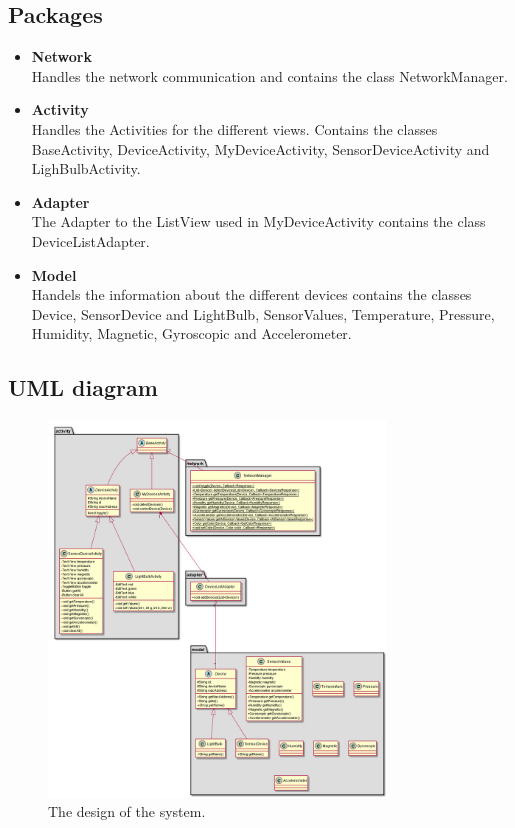 \documentclass[a4paper]{article}
\begin{document}
	\subsection{Packages}
	\begin{itemize}
		\item {\textbf{Network}} \\
        Handles the network communication and contains the class NetworkManager.
		\item {\textbf{Activity}}\\
        Handles the Activities for the different views. Contains the classes BaseActivity, DeviceActivity, MyDeviceActivity, SensorDeviceActivity and LighBulbActivity.
		\item {\textbf{Adapter}}\\
        The Adapter to the ListView used in MyDeviceActivity contains the class DeviceListAdapter.
		\item {\textbf{Model}}\\
        Handels the information about the different devices contains the classes Device, SensorDevice and LightBulb, SensorValues, Temperature, Pressure, Humidity, Magnetic, Gyroscopic and Accelerometer.
	\end{itemize}
\subsection{UML diagram}
	\begin{figure}[H]
    \centering
    \includegraphics[width=0.8\textwidth]{class_diagram.png}
    \caption{The design of the system.}
    \label{fig:uml}
\end{figure}
\end{document}
